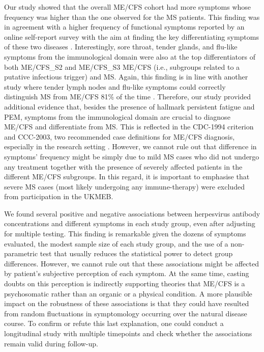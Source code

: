 Our study showed that the overall ME/CFS cohort had more symptoms whose frequency was higher than the one observed for the MS patients. This finding was in agreement with a higher frequency of functional symptoms reported by an online self-report survey with the aim at finding the key differentiating symptoms of these two diseases \citep{jasonDifferentiatingMultipleSclerosis2017}. Interestingly, sore throat, tender glands, and flu-like symptoms from the immunological domain were also at the top differentiators of both ME/CFS\_S2 and ME/CFS\_S3 ME/CFS (i.e., subgroups related to a putative infectious trigger) and MS. Again, this finding is in line with another study where tender lymph nodes and flu-like symptoms could correctly distinguish MS from ME/CFS 81\% of the time \citep{ohanian2016IdentifyingKey}. Therefore, our study provided additional evidence that, besides the presence of hallmark persistent fatigue and PEM, symptoms from the immunological domain are crucial to diagnose ME/CFS and differentiate from MS. This is reflected in the CDC-1994 criterion and CCC-2003, two recommended case definitions for ME/CFS diagnosis, especially in the research setting \citep{nacul2021EuropeanNetwork}. However, we cannot rule out that difference in symptoms' frequency might be simply due to mild MS cases who did not undergo any treatment together with the presence of severely affected patients in the different ME/CFS subgroups. In this regard, it is important to emphasise that severe MS cases (most likely undergoing any immune-therapy) were excluded from participation in the UKMEB.

We found several positive and negative associations between herpesvirus antibody concentrations and different symptoms in each study group, even after adjusting for multiple testing. This finding is remarkable given the dozens of symptoms evaluated, the modest sample size of each study group, and the use of a non-parametric test that usually reduces the statistical power to detect group differences. However, we cannot rule out that these associations might be affected by patient's subjective perception of each symptom. At the same time, casting doubts on this perception is indirectly supporting theories that ME/CFS is a psychosomatic rather than an organic or a physical condition. A more plausible impact on the robustness of these associations is that they could have resulted from random fluctuations in symptomology occurring over the natural disease course. To confirm or refute this last explanation, one could conduct a longitudinal study with multiple timepoints and check whether the associations remain valid during follow-up.

